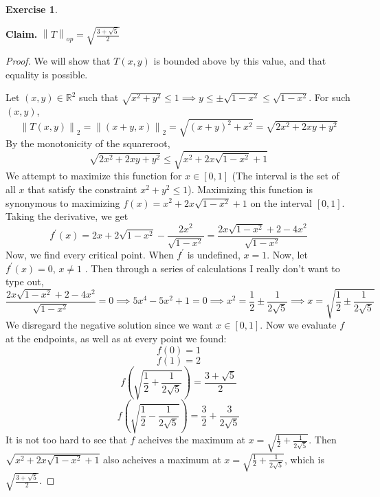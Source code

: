 \documentclass{article}
\theoremstyle{plain} %
\numberwithin{thm}{section} %
\theoremstyle{definition}
\newtheorem{exercise}[thm]{Exercise} %
\begin{document}
\begin{exercise}
\begin{enumerate}[label=(\alph*)]
            \textbf{Claim.} \(\left\lVert T \right\rVert _{op} = \sqrt{\frac{3+\sqrt{5}}{2}} \)

            \begin{proof}
                We will show that \(T(x,y)\) is bounded above by this value, and that equality is possible.
                
                Let \((x,y) \in \mathbb{R} ^2\) such that \(\sqrt{x^2 + y^2} \leq 1 \implies y \leq \pm \sqrt{1-x^2} \leq \sqrt{1-x^2}\).
                For such \((x,y)\),
                \[
                    \left\lVert T(x,y) \right\rVert _2 = \left\lVert (x+y, x) \right\rVert _2 = \sqrt{(x+y)^2 + x^2} = \sqrt{2x^2 + 2xy + y^2} 
                \]
                By the monotonicity of the squareroot,
                \[
                    \sqrt{2x^2 + 2xy + y^2} \leq \sqrt{x^2 + 2x\sqrt{1-x^2} + 1}
                \]
                We attempt to maximize this function for \(x \in [0,1]\) (The interval is the set of all \(x\) that satisfy the constraint \(x^2 + y^2 \leq 1\)). Maximizing this function is synonymous to maximizing \(f(x) = x^2 + 2x\sqrt{1-x^2} + 1\) on the interval \([0,1]\). Taking the derivative, we get
                \[
                    f^\prime(x) = 2x + 2\sqrt{1-x^2} -\frac{2x^2}{\sqrt{1-x^2}} = \frac{2x\sqrt{1-x^2} + 2 - 4x^2}{\sqrt{1-x^2}}
                \]
                Now, we find every critical point. When \(f^\prime\) is undefined, \(x = 1\).
                Now, let \(f^\prime(x) = 0\), \(x\neq 1\) . Then through a series of calculations I really don't want to type out,
                \[
                    \frac{2x\sqrt{1-x^2} + 2 - 4x^2}{\sqrt{1-x^2}} = 0 \implies 5x^4 - 5x^2 + 1 = 0 \implies x^2 = \frac{1}{2}\pm\frac{1}{2\sqrt{5}} \implies x = \sqrt{\frac{1}{2}\pm\frac{1}{2\sqrt{5}}} 
                \]
                We disregard the negative solution since we want \(x \in [0,1]\).
                Now we evaluate \(f\) at the endpoints, as well as at every point we found:
                \[
                    f(0) = 1
                \]
                \[
                    f(1) = 2
                \]
                \[
                    f\left(\sqrt{\frac{1}{2}+\frac{1}{2\sqrt{5}}}\right) = \frac{3+\sqrt{5}}{2}
                \]
                \[
                    f\left(\sqrt{\frac{1}{2}-\frac{1}{2\sqrt{5}}}\right) = \frac{3}{2}+\frac{3}{2\sqrt{5}}
                \]
                It is not too hard to see that \(f\) acheives the maximum at \(x = \sqrt{\frac{1}{2}+\frac{1}{2\sqrt{5}}}\). Then \(\sqrt{x^2 + 2x\sqrt{1-x^2} + 1}\) also acheives a maximum at \(x = \sqrt{\frac{1}{2}+\frac{1}{2\sqrt{5}}}\), which is \(\sqrt{\frac{3+\sqrt{5}}{2}}\).


\end{proof}
\end{enumerate}
\end{exercise}
\end{document}
